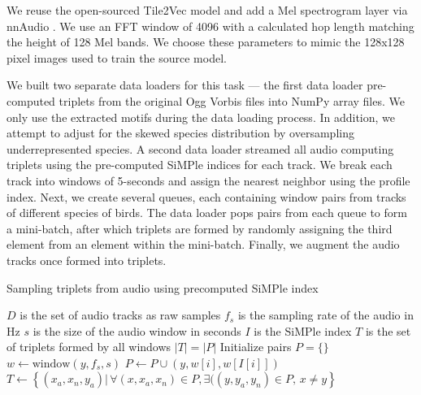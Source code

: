 \documentclass[
]{ceurart}
\begin{document}
We reuse the open-sourced Tile2Vec model and add a Mel spectrogram layer via nnAudio \cite{nn-audio}. We use an FFT window of 4096 with a calculated hop length matching the height of 128 Mel bands. We choose these parameters to mimic the 128x128 pixel images used to train the source model.

We built two separate data loaders for this task — the first data loader pre-computed triplets from the original Ogg Vorbis files into NumPy array files. We only use the extracted motifs during the data loading process. In addition, we attempt to adjust for the skewed species distribution by oversampling underrepresented species. A second data loader streamed all audio computing triplets using the pre-computed SiMPle indices for each track. We break each track into windows of 5-seconds and assign the nearest neighbor using the profile index. Next, we create several queues, each containing window pairs from tracks of different species of birds. The data loader pops pairs from each queue to form a mini-batch, after which triplets are formed by randomly assigning the third element from an element within the mini-batch. Finally, we augment the audio tracks once formed into triplets.

\begin{algorithm}
    \caption{Sampling triplets from audio using precomputed SiMPle index}
    \begin{algorithmic}
        \Require $D$ is the set of audio tracks as raw samples
        \Require $f_s$ is the sampling rate of the audio in Hz
        \Require $s$ is the size of the audio window in seconds
        \Require $I$ is the SiMPle index
        \Ensure $T$ is the set of triplets formed by all windows
        \Ensure $|T| = |P|$
        \State Initialize pairs $P = \{\}$
            \State $w \gets \text{window}(y, f_s, s)$
                \State $P \gets P \cup (y, w[i], w[I[i]])$
            \EndFor
        \EndFor
        \State $T \gets \left\{
            (x_a, x_n, y_a) |
                \,
                \forall (x, x_a, x_n) \in P,
                \exists((y, y_a, y_n) \in P
                ,
                \, x \neq y
        \right\}$
    \end{algorithmic}
\end{algorithm}
\end{document}
